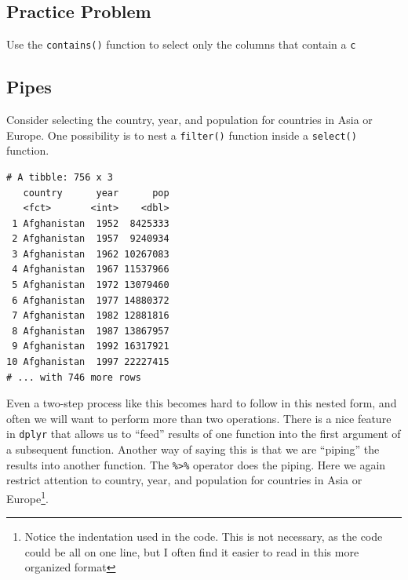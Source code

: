 \documentclass[]{krantz}
\makeatletter
\newenvironment{Shaded}{\begin{snugshade}}{\end{snugshade}}
\newcommand{\KeywordTok}[1]{\textcolor[rgb]{0.27,0.27,0.27}{\textbf{#1}}}
\newcommand{\StringTok}[1]{\textcolor[rgb]{0.5,0.5,0.5}{#1}}
\newcommand{\OperatorTok}[1]{\textcolor[rgb]{0.43,0.43,0.43}{\textbf{#1}}}
\newcommand{\NormalTok}[1]{#1}
\newenvironment{kframe}{%
\medskip{}
\setlength{\fboxsep}{.8em}
 \def\at@end@of@kframe{}%
 \ifinner\ifhmode%
  \def\at@end@of@kframe{\end{minipage}}%
  \begin{minipage}{\columnwidth}%
 \fi\fi%
 \def\FrameCommand##1{\hskip\@totalleftmargin \hskip-\fboxsep
 \colorbox{shadecolor}{##1}\hskip-\fboxsep
     \hskip-\linewidth \hskip-\@totalleftmargin \hskip\columnwidth}%
 \MakeFramed {\advance\hsize-\width
   \@totalleftmargin\z@ \linewidth\hsize
   \@setminipage}}%
 {\par\unskip\endMakeFramed%
 \at@end@of@kframe}
\renewenvironment{Shaded}{\begin{kframe}}{\end{kframe}}
\makeatother
\begin{document}
\subsection{Practice Problem}\label{practice-problem-8}

Use the \texttt{contains()} function to select only the columns that
contain a \texttt{c}

\subsection{Pipes}\label{pipes}

Consider selecting the country, year, and population for countries in
Asia or Europe. One possibility is to nest a \texttt{filter()} function
inside a \texttt{select()} function.

\begin{Shaded}
\end{Shaded}

\begin{verbatim}
# A tibble: 756 x 3
   country      year      pop
   <fct>       <int>    <dbl>
 1 Afghanistan  1952  8425333
 2 Afghanistan  1957  9240934
 3 Afghanistan  1962 10267083
 4 Afghanistan  1967 11537966
 5 Afghanistan  1972 13079460
 6 Afghanistan  1977 14880372
 7 Afghanistan  1982 12881816
 8 Afghanistan  1987 13867957
 9 Afghanistan  1992 16317921
10 Afghanistan  1997 22227415
# ... with 746 more rows
\end{verbatim}

Even a two-step process like this becomes hard to follow in this nested
form, and often we will want to perform more than two operations. There
is a nice feature in \texttt{dplyr} that allows us to ``feed'' results
of one function into the first argument of a subsequent function.
Another way of saying this is that we are ``piping'' the results into
another function. The \texttt{\%\textgreater{}\%} operator does the
piping. Here we again restrict attention to country, year, and
population for countries in Asia or Europe\footnote{Notice the
  indentation used in the code. This is not necessary, as the code could
  be all on one line, but I often find it easier to read in this more
  organized format}.
\end{document}
